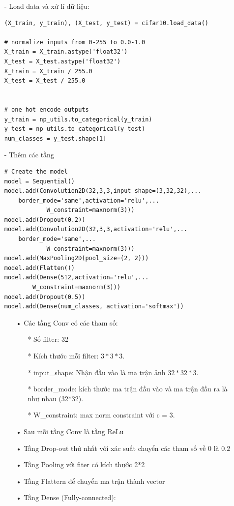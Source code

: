 \documentclass[a4paper,12pt]{report}
\begin{document}
\begin{itemize}
\item[-] Load data và xử lí dữ liệu:
\begin{lstlisting}
(X_train, y_train), (X_test, y_test) = cifar10.load_data()

# normalize inputs from 0-255 to 0.0-1.0
X_train = X_train.astype('float32')
X_test = X_test.astype('float32')
X_train = X_train / 255.0
X_test = X_test / 255.0


# one hot encode outputs
y_train = np_utils.to_categorical(y_train)
y_test = np_utils.to_categorical(y_test)
num_classes = y_test.shape[1]
\end{lstlisting}
\item[-] Thêm các tầng
{\small
\begin{lstlisting}
# Create the model
model = Sequential()
model.add(Convolution2D(32,3,3,input_shape=(3,32,32),... 
 	border_mode='same',activation='relu',...
 			W_constraint=maxnorm(3)))
model.add(Dropout(0.2))
model.add(Convolution2D(32,3,3,activation='relu',...
	border_mode='same',...
			W_constraint=maxnorm(3)))
model.add(MaxPooling2D(pool_size=(2, 2)))
model.add(Flatten())
model.add(Dense(512,activation='relu',...
		W_constraint=maxnorm(3)))
model.add(Dropout(0.5))
model.add(Dense(num_classes, activation='softmax'))
\end{lstlisting}
}
\begin{itemize}
\item[•] Các tầng Conv có các tham số:
\begin{itemize}
\item[*] Số filter: 32
\item[*] Kích thước mỗi filter: $3*3*3$.
\item[*] input\_shape: Nhận đầu vào là ma trận ảnh $32*32*3$.
\item[*] border\_mode: kích thước ma trận đầu vào và ma trận đầu ra là như nhau (32*32).
\item[*] W\_constraint: max norm constraint với c = 3.
\end{itemize}
\item[•] Sau mỗi tầng Conv là tầng ReLu
\item[•] Tầng Drop-out thứ nhất với xác suất chuyển các tham số về 0 là 0.2
\item[•] Tầng Pooling với fiter có kích thước 2*2
\item[•] Tầng Flattern để chuyển ma trận thành vector 
\item[•] Tầng Dense (Fully-connected):
\begin{itemize}

\end{itemize}
\end{itemize}
\end{itemize}
\end{document}
